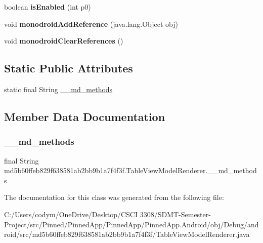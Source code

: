 \begin{DoxyCompactItemize}
boolean {\bfseries is\+Enabled} (int p0)
\item 
\mbox{\label{classmd5b60ffeb829f638581ab2bb9b1a7f4f3f_1_1_table_view_model_renderer_af694d5eaa766065b71fdc6e4204b904d}} 
void {\bfseries monodroid\+Add\+Reference} (java.\+lang.\+Object obj)
\item 
\mbox{\label{classmd5b60ffeb829f638581ab2bb9b1a7f4f3f_1_1_table_view_model_renderer_a92f10ed6c4706c14be7fcc1b40449cb2}} 
void {\bfseries monodroid\+Clear\+References} ()
\end{DoxyCompactItemize}
\subsection*{Static Public Attributes}
\begin{DoxyCompactItemize}
\item 
static final String \hyperlink{classmd5b60ffeb829f638581ab2bb9b1a7f4f3f_1_1_table_view_model_renderer_a21b72c97f46fee0f30a471fc36c20e2c}{\+\_\+\+\_\+md\+\_\+methods}
\end{DoxyCompactItemize}


\subsection{Member Data Documentation}
\mbox{\label{classmd5b60ffeb829f638581ab2bb9b1a7f4f3f_1_1_table_view_model_renderer_a21b72c97f46fee0f30a471fc36c20e2c}} 
\subsubsection{\texorpdfstring{\+\_\+\+\_\+md\+\_\+methods}{\_\_md\_methods}}
{\footnotesize\ttfamily final String md5b60ffeb829f638581ab2bb9b1a7f4f3f.\+Table\+View\+Model\+Renderer.\+\_\+\+\_\+md\+\_\+methods\hspace{0.3cm}{\ttfamily [static]}}



The documentation for this class was generated from the following file\+:\begin{DoxyCompactItemize}
\item 
C\+:/\+Users/codym/\+One\+Drive/\+Desktop/\+C\+S\+C\+I 3308/\+S\+D\+M\+T-\/\+Semester-\/\+Project/src/\+Pinned/\+Pinned\+App/\+Pinned\+App/\+Pinned\+App.\+Android/obj/\+Debug/android/src/md5b60ffeb829f638581ab2bb9b1a7f4f3f/Table\+View\+Model\+Renderer.\+java\end{DoxyCompactItemize}
